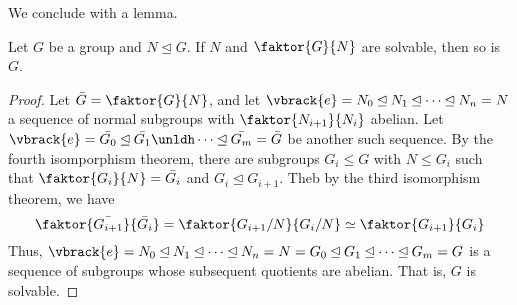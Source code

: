We conclude with a lemma.

\begin{lemma}\label{3.5.6}
    Let $G$ be a group and  $N \unlhd G$. If  $N$ and  $\faktor{G}{N}$ are
    solvable, then so is $G$.
\end{lemma}
\begin{proof}
    Let $\bar{G}=\faktor{G}{N}$, and let $\vbrack{e}=N_0 \unlhd N_1 \unlhd \dots
    \unlhd N_n=N$ a sequence of normal subgroups with $\faktor{N_{i+1}}{N_i}$
    abelian. Let $\vbrack{e}=\bar{G_0} \unlhd \bar{G_1} \unldh \dots \unlhd
    \bar{G_m}=\bar{G}$ be another such sequence. By the fourth isomporphism
    theorem, there are subgroups $G_i \leq G$ with  $N \leq G_i$ such that
    $\faktor{G_i}{N}=\bar{G_i}$ and $G_i \unlhd G_{i+1}$. Theb by the third
    isomorphism theorem, we have
    \begin{equation*}
        \faktor{\bar{G_{i+1}}}{\bar{G_i}}=\faktor{G_{i+1}/N}{G_i/N} \simeq
        \faktor{G_{i+1}}{G_i}
    \end{equation*}
    Thus, $\vbrack{e}=N_0 \unlhd N_1 \unlhd \dots \unlhd N_n=N=G_0 \unlhd G_1
    \unlhd \dots \unlhd G_m=G$ is a sequence of subgroups whose subsequent
    quotients are abelian. That is, $G$ is solvable.
\end{proof}
